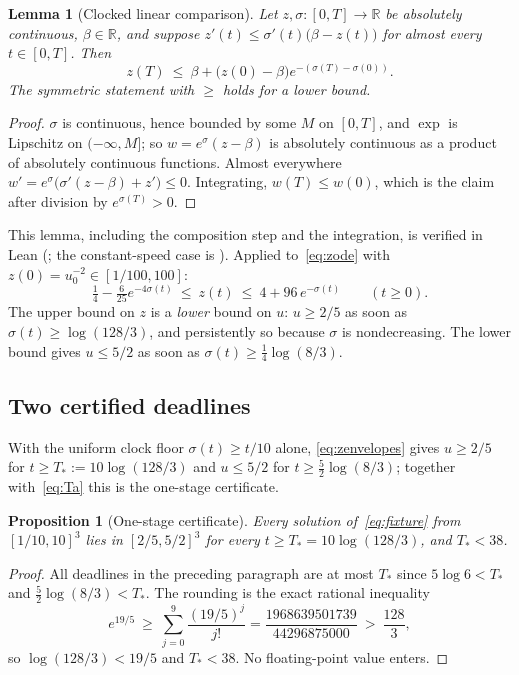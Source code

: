 \documentclass[11pt]{article}
\newtheorem{lemma}[theorem]{Lemma}
\newtheorem{proposition}[theorem]{Proposition}
\theoremstyle{definition}
\theoremstyle{remark}
\newcommand{\R}{\mathbb R}
\begin{document}
\begin{lemma}[Clocked linear comparison]\label{lem:clocked}
Let $z,\sigma:[0,T]\to\R$ be absolutely continuous, $\beta\in\R$, and suppose
$z'(t)\le\sigma'(t)\bigl(\beta-z(t)\bigr)$ for almost every $t\in[0,T]$. Then
\[
 z(T)\ \le\ \beta+\bigl(z(0)-\beta\bigr)e^{-(\sigma(T)-\sigma(0))}.
\]
The symmetric statement with $\ge$ holds for a lower bound.
\end{lemma}
\begin{proof}
$\sigma$ is continuous, hence bounded by some $M$ on $[0,T]$, and $\exp$ is
Lipschitz on $(-\infty,M]$; so $w=e^{\sigma}(z-\beta)$ is absolutely continuous as
a product of absolutely continuous functions. Almost everywhere
$w'=e^{\sigma}\bigl(\sigma'(z-\beta)+z'\bigr)\le0$. Integrating,
$w(T)\le w(0)$, which is the claim after division by $e^{\sigma(T)}>0$.
\end{proof}
This lemma, including the composition step and the integration, is verified in
Lean (; the constant-speed case is
). Applied to~\eqref{eq:zode} with $z(0)=u_0^{-2}\in[1/100,100]$:
\begin{equation}\label{eq:zenvelopes}
 \tfrac14-\tfrac{6}{25}e^{-4\sigma(t)}\ \le\ z(t)\ \le\ 4+96\,e^{-\sigma(t)}\qquad(t\ge0).
\end{equation}
The upper bound on $z$ is a \emph{lower} bound on $u$: $u\ge2/5$ as soon as
$\sigma(t)\ge\log(128/3)$, and persistently so because $\sigma$ is nondecreasing.
The lower bound gives $u\le5/2$ as soon as $\sigma(t)\ge\frac14\log(8/3)$.

\subsection{Two certified deadlines}\label{sec:deadlines}
With the uniform clock floor $\sigma(t)\ge t/10$ alone,
\eqref{eq:zenvelopes} gives $u\ge2/5$ for $t\ge T_*:=10\log(128/3)$ and $u\le5/2$
for $t\ge\frac52\log(8/3)$; together with~\eqref{eq:Ta} this is the one-stage
certificate.

\begin{proposition}[One-stage certificate]\label{prop:38}
Every solution of~\eqref{eq:fixture} from $[1/10,10]^3$ lies in $[2/5,5/2]^3$ for
every $t\ge T_*=10\log(128/3)$, and $T_*<38$.
\end{proposition}
\begin{proof}
All deadlines in the preceding paragraph are at most $T_*$ since $5\log6<T_*$ and
$\frac52\log(8/3)<T_*$. The rounding is the exact rational inequality
\begin{equation}\label{eq:rational38}
 e^{19/5}\ \ge\ \sum_{j=0}^{9}\frac{(19/5)^j}{j!}=\frac{1968639501739}{44296875000}\ >\ \frac{128}{3},
\end{equation}
so $\log(128/3)<19/5$ and $T_*<38$. No floating-point value enters.
\end{proof}
\end{document}
